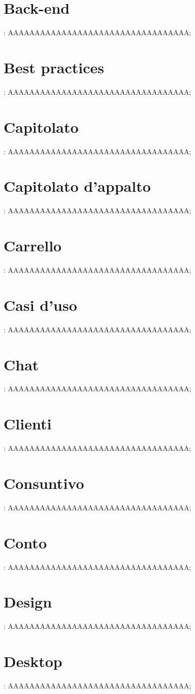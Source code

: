 \section{Back-end}: AAAAAAAAAAAAAAAAAAAAAAAAAAAAAAAAAA;
\section{Best practices}: AAAAAAAAAAAAAAAAAAAAAAAAAAAAAAAAAA;
\section{Capitolato}: AAAAAAAAAAAAAAAAAAAAAAAAAAAAAAAAAA;
\section{Capitolato d’appalto}: AAAAAAAAAAAAAAAAAAAAAAAAAAAAAAAAAA;
\section{Carrello}: AAAAAAAAAAAAAAAAAAAAAAAAAAAAAAAAAA;
\section{Casi d’uso}: AAAAAAAAAAAAAAAAAAAAAAAAAAAAAAAAAA;
\section{Chat}: AAAAAAAAAAAAAAAAAAAAAAAAAAAAAAAAAA;
\section{Clienti}: AAAAAAAAAAAAAAAAAAAAAAAAAAAAAAAAAA;
\section{Consuntivo}: AAAAAAAAAAAAAAAAAAAAAAAAAAAAAAAAAA;
\section{Conto}: AAAAAAAAAAAAAAAAAAAAAAAAAAAAAAAAAA;
\section{Design}: AAAAAAAAAAAAAAAAAAAAAAAAAAAAAAAAAA;
\section{Desktop}: AAAAAAAAAAAAAAAAAAAAAAAAAAAAAAAAAA;
